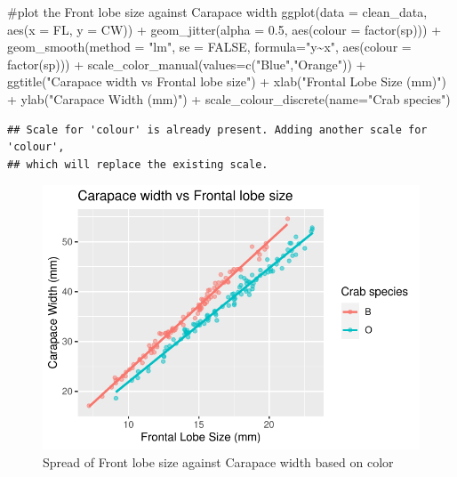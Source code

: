 \documentclass[
]{article}
\newenvironment{Shaded}{}{}
\newcommand{\AttributeTok}[1]{#1}
\newcommand{\CommentTok}[1]{\textcolor[rgb]{0.00,0.50,0.00}{#1}}
\newcommand{\ConstantTok}[1]{#1}
\newcommand{\FloatTok}[1]{#1}
\newcommand{\FunctionTok}[1]{#1}
\newcommand{\NormalTok}[1]{#1}
\newcommand{\SpecialCharTok}[1]{\textcolor[rgb]{0.00,0.50,0.50}{#1}}
\newcommand{\StringTok}[1]{\textcolor[rgb]{0.00,0.50,0.50}{#1}}
\begin{document}
\begin{Shaded}
\begin{Highlighting}[]
\CommentTok{\#plot the Front lobe size against Carapace width}
\FunctionTok{ggplot}\NormalTok{(}\AttributeTok{data =}\NormalTok{ clean\_data,  }
\FunctionTok{aes}\NormalTok{(}\AttributeTok{x =}\NormalTok{ FL, }\AttributeTok{y =}\NormalTok{ CW)) }\SpecialCharTok{+} 
  \FunctionTok{geom\_jitter}\NormalTok{(}\AttributeTok{alpha =} \FloatTok{0.5}\NormalTok{, }\FunctionTok{aes}\NormalTok{(}\AttributeTok{colour =} \FunctionTok{factor}\NormalTok{(sp))) }\SpecialCharTok{+}  
  \FunctionTok{geom\_smooth}\NormalTok{(}\AttributeTok{method =} \StringTok{"lm"}\NormalTok{, }\AttributeTok{se =} \ConstantTok{FALSE}\NormalTok{, }\AttributeTok{formula=}\StringTok{"y\textasciitilde{}x"}\NormalTok{, }\FunctionTok{aes}\NormalTok{(}\AttributeTok{colour =}   \FunctionTok{factor}\NormalTok{(sp))) }\SpecialCharTok{+}
  \FunctionTok{scale\_color\_manual}\NormalTok{(}\AttributeTok{values=}\FunctionTok{c}\NormalTok{(}\StringTok{"Blue"}\NormalTok{,}\StringTok{"Orange"}\NormalTok{)) }\SpecialCharTok{+}
  \FunctionTok{ggtitle}\NormalTok{(}\StringTok{"Carapace width vs Frontal lobe size"}\NormalTok{) }\SpecialCharTok{+} 
  \FunctionTok{xlab}\NormalTok{(}\StringTok{"Frontal Lobe Size (mm)"}\NormalTok{) }\SpecialCharTok{+} \FunctionTok{ylab}\NormalTok{(}\StringTok{"Carapace Width (mm)"}\NormalTok{) }\SpecialCharTok{+}
  \FunctionTok{scale\_colour\_discrete}\NormalTok{(}\AttributeTok{name=}\StringTok{"Crab species"}\NormalTok{)}
\end{Highlighting}
\end{Shaded}

\begin{verbatim}
## Scale for 'colour' is already present. Adding another scale for 'colour',
## which will replace the existing scale.
\end{verbatim}

\begin{figure}[H]

{\centering \includegraphics{Log_files/figure-latex/figure1-1} 

}

\caption{Spread of Front lobe size against Carapace width based on color}\label{fig:figure1}
\end{figure}
\end{document}
